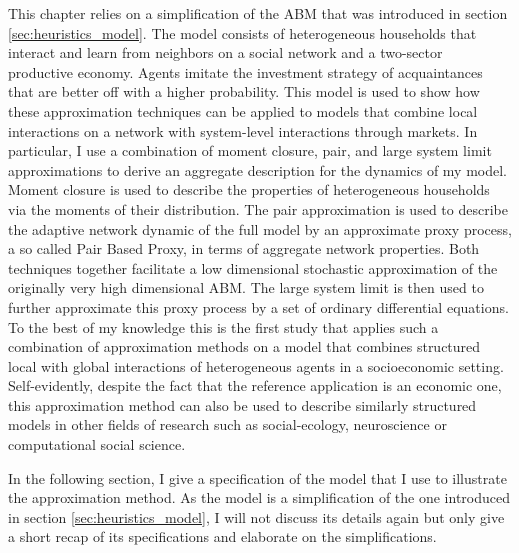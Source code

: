 This chapter relies on a simplification of the ABM that was introduced in section \ref{sec:heuristics_model}. The model consists of heterogeneous households that interact and learn from neighbors on a social network and a two-sector productive economy.
Agents imitate the investment strategy of acquaintances that are better off with a higher probability.
This model is used to show how these approximation techniques can be applied to models that combine local interactions on a network with system-level interactions through markets.
In particular, I use a combination of moment closure, pair, and large system limit approximations to derive an aggregate description for the dynamics of my model. Moment closure is used to describe the properties of heterogeneous households via the moments of their distribution. The pair approximation is used to describe the adaptive network dynamic of the full model by an approximate proxy process, a so called Pair Based Proxy, in terms of aggregate network properties. Both techniques together facilitate a low dimensional stochastic approximation of the originally very high dimensional ABM. The large system limit is then used to further approximate this proxy process by a set of ordinary differential equations.
To the best of my knowledge this is the first study that applies such a combination of approximation methods on a model that combines structured local with global interactions of heterogeneous agents in a socioeconomic setting.
Self-evidently, despite the fact that the reference application is an economic one, this approximation method can also be used to describe similarly structured models in other fields of research such as social-ecology, neuroscience or computational social science.

In the following section, I give a specification of the model that I use to illustrate the approximation method. As the model is a simplification of the one introduced in section \ref{sec:heuristics_model}, I will not discuss its details again but only give a short recap of its specifications and elaborate on the simplifications.

